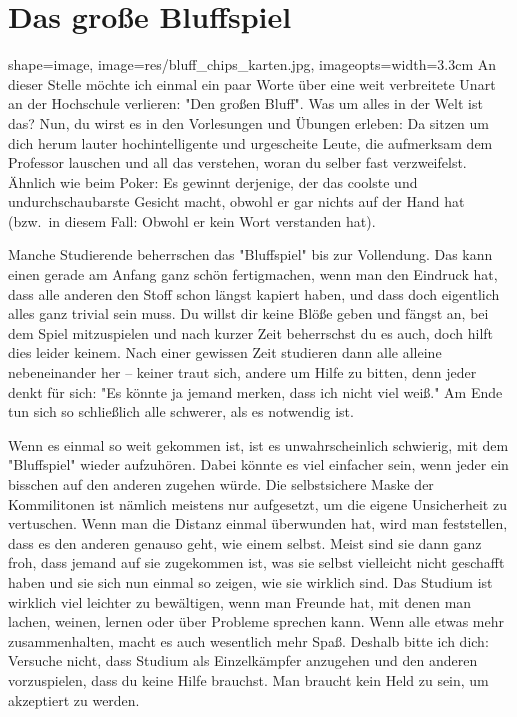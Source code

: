 
\enlargethispage{\baselineskip}
\vspace*{-1cm}
\section{Das große Bluffspiel}
\vspace*{-0.3cm}
\begin{pullquote}{shape=image, image=res/bluff_chips_karten.jpg, imageopts={width=3.3cm}}
An dieser Stelle möchte ich einmal ein paar Worte über eine weit verbreitete Unart an der Hochschule verlieren: "Den großen Bluff". Was um alles in der Welt ist das? Nun, du wirst es in den Vorlesungen und Übungen erleben: Da sitzen um dich herum lauter hochintelligente und urgescheite Leute, die aufmerksam dem Professor lauschen und all das verstehen, woran du selber fast verzweifelst. Ähnlich wie beim Poker: Es gewinnt derjenige, der das coolste und undurchschaubarste Gesicht macht, obwohl er gar nichts auf der Hand hat (bzw.\ in diesem Fall: Obwohl er kein Wort verstanden hat).\pullquotenl

Manche Studierende beherrschen das "Bluffspiel" bis zur Vollendung. Das kann einen gerade am Anfang ganz schön fertigmachen, wenn man den Eindruck hat, dass alle anderen den Stoff schon längst kapiert haben, und dass doch eigentlich alles ganz trivial sein muss. Du willst dir keine Blöße geben und fängst an, bei dem Spiel mitzuspielen und nach kurzer Zeit beherrschst du es auch, doch hilft dies leider keinem. Nach einer gewissen Zeit studieren dann alle alleine nebeneinander her -- keiner traut sich, andere um Hilfe zu bitten, denn jeder denkt für sich: "Es könnte ja jemand merken, dass ich nicht viel weiß." Am Ende tun sich so schließlich alle schwerer, als es notwendig ist.\pullquotenl

Wenn es einmal so weit gekommen ist, ist es unwahrscheinlich schwierig, mit dem "Bluffspiel" wieder aufzuhören. Dabei könnte es viel einfacher sein, wenn jeder ein bisschen auf den anderen zugehen würde. Die selbstsichere Maske der Kommilitonen ist nämlich meistens nur aufgesetzt, um die eigene Unsicherheit zu vertuschen. Wenn man die Distanz einmal überwunden hat, wird man feststellen, dass es den anderen genauso geht, wie einem selbst. Meist sind sie dann ganz froh, dass jemand auf sie zugekommen ist, was sie selbst vielleicht nicht geschafft haben und sie sich nun einmal so zeigen, wie sie wirklich sind. Das Studium ist wirklich viel leichter zu bewältigen, wenn man Freunde hat, mit denen man lachen, weinen, lernen oder über Probleme sprechen kann. Wenn alle etwas mehr zusammenhalten, macht es auch wesentlich mehr Spaß. Deshalb bitte ich dich: Versuche nicht, dass Studium als Einzelkämpfer anzugehen und den anderen vorzuspielen, dass du keine Hilfe brauchst. Man braucht kein Held zu sein, um akzeptiert zu werden.

\end{pullquote}

